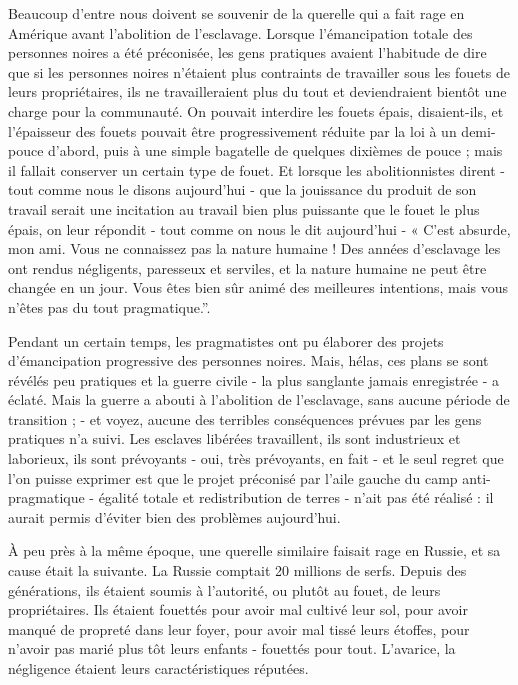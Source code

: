 Beaucoup d'entre nous doivent se souvenir de la querelle qui a fait rage en Amérique avant l'abolition de l'esclavage. Lorsque l'émancipation totale des personnes noires a été préconisée, les gens pratiques avaient l'habitude de dire que si les personnes noires n'étaient plus contraints de travailler sous les fouets de leurs propriétaires, ils ne travailleraient plus du tout et deviendraient bientôt une charge pour la communauté. On pouvait interdire les fouets épais, disaient-ils, et l'épaisseur des fouets pouvait être progressivement réduite par la loi à un demi-pouce d'abord, puis à une simple bagatelle de quelques dixièmes de pouce ; mais il fallait conserver un certain type de fouet. Et lorsque les abolitionnistes dirent - tout comme nous le disons aujourd'hui - que la jouissance du produit de son travail serait une incitation au travail bien plus puissante que le fouet le plus épais, on leur répondit - tout comme on nous le dit aujourd'hui - « C'est absurde, mon ami. Vous ne connaissez pas la nature humaine ! Des années d'esclavage les ont rendus négligents, paresseux et serviles, et la nature humaine ne peut être changée en un jour. Vous êtes bien sûr animé des meilleures intentions, mais vous n'êtes pas du tout pragmatique.''.

Pendant un certain temps, les pragmatistes ont pu élaborer des projets d'émancipation progressive des personnes noires. Mais, hélas, ces plans se sont révélés peu pratiques et la guerre civile - la plus sanglante jamais enregistrée - a éclaté. Mais la guerre a abouti à l'abolition de l'esclavage, sans aucune période de transition ; - et voyez, aucune des terribles conséquences prévues par les gens pratiques n'a suivi. Les esclaves libérées travaillent, ils sont industrieux et laborieux, ils sont prévoyants - oui, très prévoyants, en fait - et le seul regret que l'on puisse exprimer est que le projet préconisé par l'aile gauche du camp anti-pragmatique - égalité totale et redistribution de terres - n'ait pas été réalisé : il aurait permis d'éviter bien des problèmes aujourd'hui.

À peu près à la même époque, une querelle similaire faisait rage en Russie, et sa cause était la suivante. La Russie comptait 20 millions de serfs. Depuis des générations, ils étaient soumis à l'autorité, ou plutôt au fouet, de leurs propriétaires. Ils étaient fouettés pour avoir mal cultivé leur sol, pour avoir manqué de propreté dans leur foyer, pour avoir mal tissé leurs étoffes, pour n'avoir pas marié plus tôt leurs enfants - fouettés pour tout. L'avarice, la négligence étaient leurs caractéristiques réputées.

